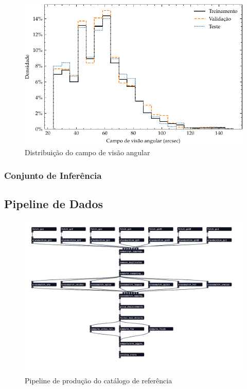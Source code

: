\begin{figure}[!ht]
  \centering
  \caption{Distribuição do campo de visão angular}
  \label{fig:conjuntos_fov}
  \includegraphics[width=\linewidth]{notebooks/plots/conjuntos_fov.pdf}
\end{figure}







\subsubsection{Conjunto de Inferência}
\label{sec:aquisicao-inferencia}

\subsection{Pipeline de Dados}
\label{sec:dados-inferencia-pipeline}

\lipsum[1-2]

\begin{figure}[h!]
  \centering
  \caption{Pipeline de produção do catálogo de referência}
  \label{fig:pipeline-ref}
  \includegraphics[width=\linewidth,trim={8mm 20mm 15mm 8mm},clip]{figures/pipe.pdf}
\end{figure}






